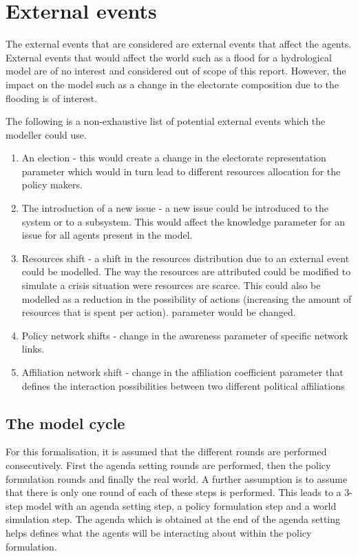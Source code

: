 \section{External events}

The external events that are considered are external events that affect the agents. External events that would affect the world such as a flood for a hydrological model are of no interest and considered out of scope of this report. However, the impact on the model such as a change in the electorate composition due to the flooding is of interest.

The following is a non-exhaustive list of potential external events which the modeller could use.

\begin{enumerate}
\item An election - this would create a change in the electorate representation parameter which would in turn lead to different resources allocation for the policy makers.
\item The introduction of a new issue - a new issue could be introduced to the system or to a subsystem. This would affect the knowledge parameter for an issue for all agents present in the model.
\item Resources shift - a shift in the resources distribution due to an external event could be modelled. The way the resources are attributed could be modified to simulate a crisis situation were resources are scarce. This could also be modelled as a reduction in the possibility of actions (increasing the amount of resources that is spent per action).
parameter would be changed.
\item Policy network shifts - change in the awareness parameter of specific network links.
\item Affiliation network shift - change in the affiliation coefficient parameter that defines the interaction possibilities between two different political affiliations
\end{enumerate}

\subsection{The model cycle}

For this formalisation, it is assumed that the different rounds are performed consecutively. First the agenda setting rounds are performed, then the policy formulation rounds and finally the real world. A further assumption is to assume that there is only one round of each of these steps is performed. This leads to a 3-step model with an agenda setting step, a policy formulation step and a world simulation step. The agenda which is obtained at the end of the agenda setting helps defines what the agents will be interacting about within the policy formulation.

